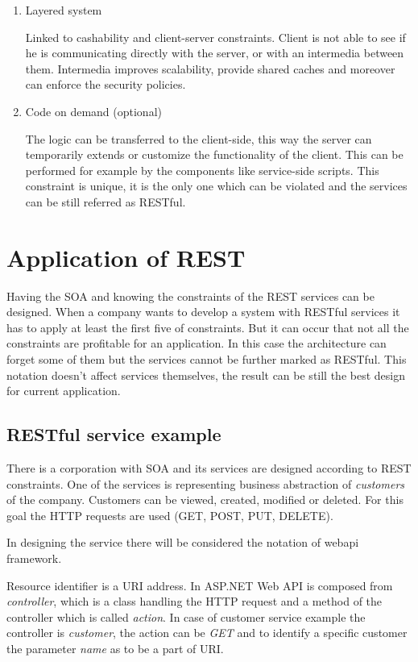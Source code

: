 \begin{description}
\begin{enumerate}
\item Layered system

Linked to cashability and client-server constraints. Client is not able to see if he is communicating directly with the server, or with an intermedia between them. Intermedia improves scalability, provide shared caches and moreover can enforce the security policies.

\item Code on demand (optional)

The logic can be transferred to the client-side, this way the server can temporarily extends or customize the functionality of the client. This can be performed for example by the components like service-side scripts.
This constraint is unique, it is the only one which can be violated and the services can be still referred as RESTful.

\end{enumerate}
\end{description}

\bigskip
\section{Application of REST}

Having the SOA and knowing the constraints of the REST services can be designed. When a company wants to develop a system with RESTful services it has to apply at least the first five of constraints. But it can occur that not all the constraints are profitable for an application. In this case the architecture can forget some of them but the services cannot be further marked as RESTful. This notation doesn't affect services themselves, the result can be still the best design for current application.

\subsection{RESTful service example}
There is a corporation with SOA and its services are designed according to REST constraints. One of the services is representing business abstraction of \emph{customers} of the company. Customers can be viewed, created, modified or deleted. For this goal the HTTP requests are used (GET, POST, PUT, DELETE). 

In designing the service there will be considered the notation of \gls{webapi} \gls{framework}. 

Resource identifier is a URI address. In ASP.NET Web API is composed from \emph{controller}, which is a class handling the HTTP request and a method of the controller which is called \emph{action}. In case of customer service example the controller is \emph{customer}, the action can be \emph{GET} and to identify a specific customer the parameter \emph{name} as to be a part of URI.

